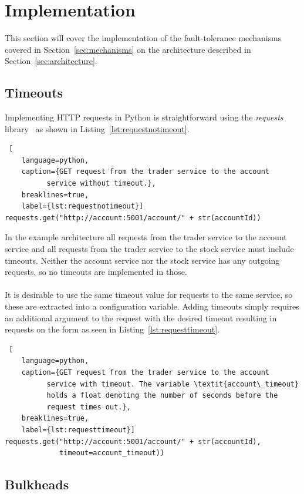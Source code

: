\section{Implementation}\label{sec:implementation}
This section will cover the implementation of the fault-tolerance mechanisms
covered in Section~\ref{sec:mechanisms} on the architecture described in
Section~\ref{sec:architecture}.

\subsection{Timeouts}
Implementing HTTP requests in Python is straightforward using the
\textit{requests} library~\cite{requests} as shown in
Listing~\ref{lst:requestnotimeout}.

\begin{lstlisting} [
	language=python,
	caption={GET request from the trader service to the account
          service without timeout.},
	breaklines=true,
	label={lst:requestnotimeout}]
requests.get("http://account:5001/account/" + str(accountId))
\end{lstlisting}

In the example architecture all requests from the
trader service to the account service and all requests from the trader
service to the stock service must include timeouts. Neither the
account service nor the stock service has any outgoing requests, so no
timeouts are implemented in those.
\\\\
It is desirable to use the same timeout value for requests to the same
service, so these are extracted into a configuration variable. Adding
timeouts simply requires an additional argument to the request with
the desired timeout resulting in requests on the form as seen in
Listing~\ref{lst:requesttimeout}.

\begin{lstlisting} [
	language=python,
	caption={GET request from the trader service to the account
          service with timeout. The variable \textit{account\_timeout}
          holds a float denoting the number of seconds before the
          request times out.},
	breaklines=true,
	label={lst:requesttimeout}]
requests.get("http://account:5001/account/" + str(accountId),
             timeout=account_timeout))
\end{lstlisting}

\subsection{Bulkheads}

